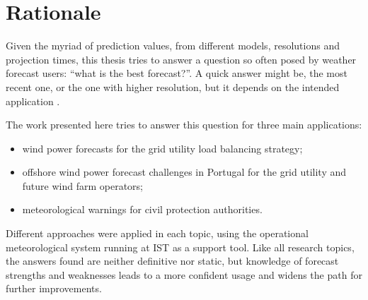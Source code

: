 
\section{Rationale}
\label{sec:racionale}

Given the myriad of prediction values, from different models, resolutions and projection times, this thesis tries to answer a question so often posed by weather forecast users: ``what is the best forecast?''. A quick answer might be, the most recent one, or the one with higher resolution, but it depends on the intended application \citep{MassEtAl2002}.

The work presented here tries to answer this question for three main applications:

\begin{itemize}
\item wind power forecasts for the grid utility load balancing strategy;
\item offshore wind power forecast challenges in Portugal for the grid utility and future wind farm operators;
\item meteorological warnings for civil protection authorities.
\end{itemize}

Different approaches were applied in each topic, using the operational meteorological system running at IST as a support tool. Like all research topics, the answers found are neither definitive nor static, but knowledge of forecast strengths and weaknesses leads to a more confident usage and widens the path for further improvements.

